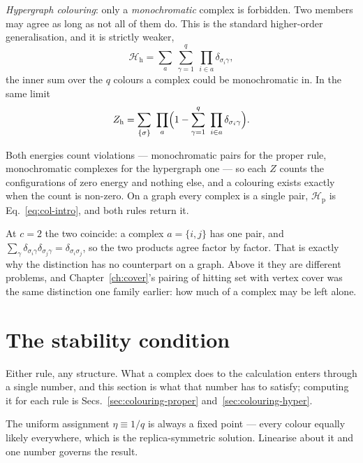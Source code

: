 \emph{Hypergraph colouring}: only a \emph{monochromatic} complex is forbidden.
Two members may agree as long as not all of them do. This is the standard
higher-order generalisation, and it is strictly weaker,
\begin{equation}
  \mathcal{H}_{\mathrm{h}}=\sum_{a}\ \sum_{\gamma=1}^{q}\ \prod_{i\in a}
     \delta_{\sigma_{i}\gamma},
  \label{eq:colHh}
\end{equation}
the inner sum over the $q$ colours a complex could be monochromatic in. In the
same limit
\begin{equation}
  Z_{\mathrm{h}}=\sum_{\{\sigma\}}\ \prod_{a}
     \Bigl(1-\sum_{\gamma=1}^{q}\ \prod_{i\in a}
     \delta_{\sigma_{i}\gamma}\Bigr).
  \label{eq:colZh}
\end{equation}

Both energies count violations --- monochromatic pairs for the proper rule,
monochromatic complexes for the hypergraph one --- so each $Z$ counts the
configurations of zero energy and nothing else, and a colouring exists exactly
when the count is non-zero. On a graph every complex is a single pair,
$\mathcal{H}_{\mathrm{p}}$ is Eq.~\eqref{eq:col-intro}, and both rules return
it.

At $c=2$ the two coincide: a complex $a=\{i,j\}$ has one pair, and
$\sum_{\gamma}\delta_{\sigma_{i}\gamma}\delta_{\sigma_{j}\gamma}
=\delta_{\sigma_{i}\sigma_{j}}$, so the two products agree factor by
factor. That is exactly why the distinction has no
counterpart on a graph. Above it they are different problems, and
Chapter~\ref{ch:cover}'s pairing of hitting set with vertex cover was the same
distinction one family earlier: how much of a complex may be left alone.

\section{The stability condition}
\label{sec:colouring-scalar}
\label{sec:colouringthreshold}

Either rule, any structure. What a complex does to the calculation enters
through a single number, and this section is what that number has to satisfy;
computing it for each rule is Secs.~\ref{sec:colouring-proper}
and~\ref{sec:colouring-hyper}.

The uniform assignment $\eta\equiv1/q$ is always a fixed point --- every colour
equally likely everywhere, which is the replica-symmetric solution. Linearise
about it and one number governs the result.

